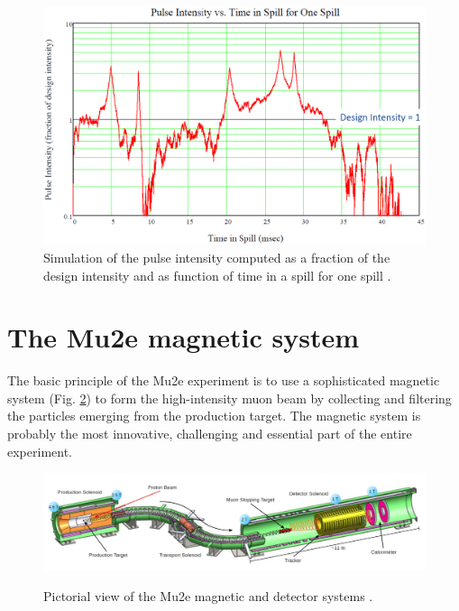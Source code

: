 \documentclass[12pt,a4paper,openright, oneside, titlepage]{book} %
\begin{document}
\begin{figure}[!htb]
\centering
\includegraphics[scale=0.6]{POT_sim}
\caption[Proton pulse intensity fluctuations]{Simulation of the pulse intensity computed as a fraction of the design intensity and as function of time in a spill for one spill \cite{SpillSim}.}
\label{_POT_sim}
\end{figure}

\section{The Mu2e magnetic system}
The basic principle of the Mu2e experiment is to use a sophisticated magnetic system (Fig. \ref{_mu2e_apparatus_pre}) 
to form the high-intensity muon beam by collecting and filtering the particles emerging from the production target. 
The magnetic system is probably the most innovative, challenging and essential part of the entire experiment. 

\begin{figure}[h!]
\centering
\includegraphics[scale=0.6]{mu2e_apparatus}\\
\caption[Mu2e apparatus]{Pictorial view of the Mu2e magnetic and detector systems \cite{Giovannella}.}
\label{_mu2e_apparatus_pre}
\end{figure}
\end{document}
